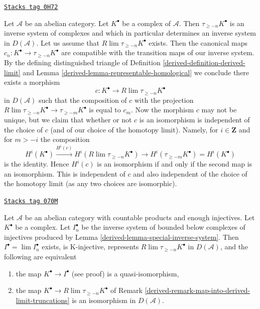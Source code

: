 \begin{remark}
\label{derived-remark-map-into-derived-limit-truncations}
\href{https://stacks.math.columbia.edu/tag/0H72}{\texttt{Stacks tag 0H72}}

Let $\mathcal{A}$ be an abelian category. Let $K^\bullet$ be a
complex of $\mathcal{A}$. Then $\tau_{\geq -n}K^\bullet$ is an
inverse system of complexes and which in particular determines
an inverse system in $D(\mathcal{A})$. Let us assume that
$R\lim \tau_{\geq -n}K^\bullet$ exists. Then the canonical maps
$c_n : K^\bullet \to \tau_{\geq -n}K^\bullet$ are compatible with the
transition maps of our inverse system. By the defining distinguished
triangle of Definition \ref{derived-definition-derived-limit} and
Lemma \ref{derived-lemma-representable-homological}
we conclude there exists a morphism
$$
c : K^\bullet \longrightarrow R\lim \tau_{\geq -n}K^\bullet
$$
in $D(\mathcal{A})$ such that the composition of $c$ with the projection
$R\lim \tau_{\geq -n}K^\bullet \to \tau_{\geq -m}K^\bullet$ is equal to $c_m$.
Now the morphism $c$ may not be unique, but we claim that whether or not
$c$ is an isomorphism is independent of the choice of $c$ (and of our choice
of the homotopy limit). Namely, for $i \in \mathbf{Z}$ and for $m > -i$
the composition
$$
H^i(K^\bullet) \xrightarrow{H^i(c)} H^i(R\lim \tau_{\geq -n}K^\bullet)
\to H^i(\tau_{\geq -m}K^\bullet) = H^i(K^\bullet)
$$
is the identity. Hence $H^i(c)$ is an isomorphism if and only if the
second map is an isomorphism. This is independent of $c$ and also
independent of the choice of the homotopy limit (as any two choices
are isomorphic).
\end{remark}

\begin{lemma}
\label{derived-lemma-difficulty-K-injectives}
\href{https://stacks.math.columbia.edu/tag/070M}{\texttt{Stacks tag 070M}}

Let $\mathcal{A}$ be an abelian category with countable products and
enough injectives. Let $K^\bullet$ be a complex. Let $I_n^\bullet$ be
the inverse system of bounded below complexes of injectives produced by
Lemma \ref{derived-lemma-special-inverse-system}. Then
$I^\bullet = \lim I_n^\bullet$ exists, is K-injective, represents
$R\lim \tau_{\geq -n}K^\bullet$ in $D(\mathcal{A})$,
and the following are equivalent
\begin{enumerate}
\item the map $K^\bullet \to I^\bullet$ (see proof) is a quasi-isomorphism,
\item the map $K^\bullet \to R\lim \tau_{\geq -n}K^\bullet$
of Remark \ref{derived-remark-map-into-derived-limit-truncations}
is an isomorphism in $D(\mathcal{A})$.
\end{enumerate}
\end{lemma}


